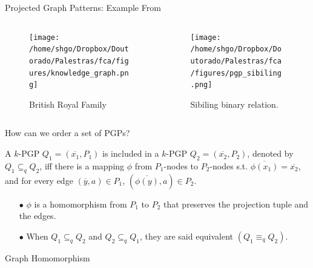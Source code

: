 \documentclass[pdf,xcolor=table]{beamer}
\begin{document}
\begin{frame}[t]{Projected Graph Patterns: Example From \cite{Ferre2016}}
    \begin{columns}
        \begin{column}{0.6\textwidth}
            \begin{figure}[h]
                \texttt{[image: /home/shgo/Dropbox/Doutorado/Palestras/fca/figures/knowledge\_graph.png]}
                \caption{British Royal Family}
            \end{figure}
        \end{column}
        \begin{column}{0.4\textwidth}
            \begin{figure}[h]
                \texttt{[image: /home/shgo/Dropbox/Doutorado/Palestras/fca/figures/pgp\_sibiling.png]}
                \caption{Sibiling binary relation.}
            \end{figure}
        \end{column}
    \end{columns}
\end{frame}

\begin{frame}[t]{How can we order a set of PGPs?}
    \begin{definition}
        A $k$-PGP $Q_1 = (\overline{x_1}, P_1)$ is included in a $k$-PGP $Q_2 = (\overline{x_2}, P_2)$, denoted by $Q_1 \subseteq_q Q_2$, iff there is a mapping $\phi$ from $P_1$-nodes to $P_2$-nodes s.t. $\overline{\phi(x_1)} = \overline{x_2}$, and for every edge $(\overline{y}, a) \in P_1$, $(\overline{\phi(y)}, a) \in P_2$.
    \end{definition}
    \begin{itemize}
        \item[$\bullet$] $\phi$ is a homomorphism from $P_1$ to $P_2$ that preserves the projection tuple and the edges.
        \item[$\bullet$] When $Q_1 \subseteq_q Q_2$ and $Q_2 \subseteq_q Q_1$, they are said equivalent $(Q_1 \equiv_q Q_2)$.
    \end{itemize}
\end{frame}

\begin{frame}[t]{Graph Homomorphism}
    \cite{Brewster}
\end{frame}


\end{document}
